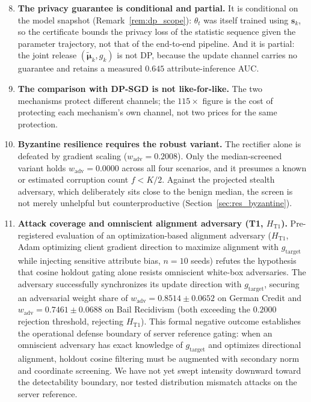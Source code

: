 \documentclass[preprint,12pt]{elsarticle}
\theoremstyle{plain}
\theoremstyle{definition}
\theoremstyle{remark}
\begin{document}
\begin{enumerate}
\setcounter{enumi}{7}
\item \textbf{The privacy guarantee is conditional and partial.} It is conditional on the model snapshot (Remark~\ref{rem:dp_scope}): $\theta_t$ was itself trained using $\bm{s}_k$, so the certificate bounds the privacy loss of the statistic sequence given the parameter trajectory, not that of the end-to-end pipeline. And it is partial: the joint release $(\tilde{\bm{\mu}}_k, g_k)$ is not DP, because the update channel carries no guarantee and retains a measured $0.645$ attribute-inference AUC.

\item \textbf{The comparison with DP-SGD is not like-for-like.} The two mechanisms protect different channels; the $115\times$ figure is the cost of protecting each mechanism's own channel, not two prices for the same protection.

\item \textbf{Byzantine resilience requires the robust variant.} The rectifier alone is defeated by gradient scaling ($w_{\mathrm{adv}} = 0.2008$). Only the median-screened variant holds $w_{\mathrm{adv}} = 0.0000$ across all four scenarios, and it presumes a known or estimated corruption count $f < K/2$. Against the projected stealth adversary, which deliberately sits close to the benign median, the screen is not merely unhelpful but counterproductive (Section~\ref{sec:res_byzantine}).

\item \textbf{Attack coverage and omniscient alignment adversary (T1, $H_{\text{T1}}$).}
Pre-registered evaluation of an optimization-based alignment adversary ($H_{\text{T1}}$, Adam optimizing client gradient direction to maximize alignment with $g_{\mathrm{target}}$ while injecting sensitive attribute bias, $n=10$ seeds) refutes the hypothesis that cosine holdout gating alone resists omniscient white-box adversaries. The adversary successfully synchronizes its update direction with $g_{\mathrm{target}}$, securing an adversarial weight share of $w_{\mathrm{adv}} = 0.8514 \pm 0.0652$ on German Credit and $w_{\mathrm{adv}} = 0.7461 \pm 0.0688$ on Bail Recidivism (both exceeding the $0.2000$ rejection threshold, rejecting $H_{\text{T1}}$). This formal negative outcome establishes the operational defense boundary of server reference gating: when an omniscient adversary has exact knowledge of $g_{\mathrm{target}}$ and optimizes directional alignment, holdout cosine filtering must be augmented with secondary norm and coordinate screening. We have not yet swept intensity downward toward the detectability boundary, nor tested distribution mismatch attacks on the server reference.


\end{enumerate}
\end{document}
